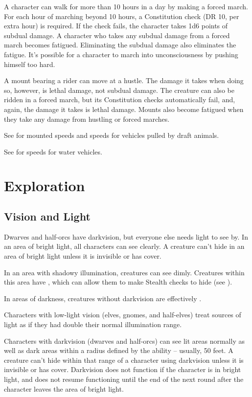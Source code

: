         A character can walk for more than 10 hours in a day by making a forced march. For each hour of marching beyond 10 hours, a Constitution check (DR 10,  per extra hour) is required. If the check fails, the character takes 1d6 points of subdual damage. A character who takes any subdual damage from a forced march becomes fatigued. Eliminating the subdual damage also eliminates the fatigue. It's possible for a character to march into unconsciousness by pushing himself too hard.

         A mount bearing a rider can move at a hustle. The damage it takes when doing so, however, is lethal damage, not subdual damage. The creature can also be ridden in a forced march, but its Constitution checks automatically fail, and, again, the damage it takes is lethal damage. Mounts also become fatigued when they take any damage from hustling or forced marches.

        See  for mounted speeds and speeds for vehicles pulled by draft animals.

         See  for speeds for water vehicles.

\section{Exploration}
    \subsection{Vision and Light}
        Dwarves and half-orcs have darkvision, but everyone else needs light to see by.  In an area of bright light, all characters can see clearly. A creature can't hide in an area of bright light unless it is invisible or has cover.

        In an area with shadowy illumination, creatures can see dimly.
        Creatures within this area have \concealment, which can allow them to make Stealth checks to hide (see ).

        In areas of darkness, creatures without darkvision are effectively \blinded.

        Characters with low-light vision (elves, gnomes, and half-elves) treat sources of light as if they had double their normal illumination range.

        Characters with darkvision (dwarves and half-orcs) can see lit areas normally as well as dark areas within a radius defined by the ability -- usually, 50 feet. A creature can't hide within that range of a character using darkvision unless it is invisible or has cover. Darkvision does not function if the character is in bright light, and does not resume functioning until the end of the next round after the character leaves the area of bright light.

